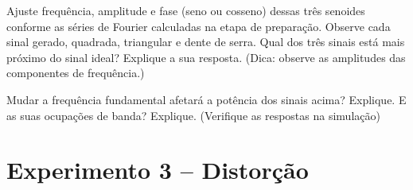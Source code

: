 \documentclass[12pt,addpoints]{exam}
\begin{document}
\begin{questions}
  \question Ajuste frequência, amplitude e fase (seno ou cosseno) dessas três senoides conforme as séries de Fourier calculadas na etapa de preparação. Observe cada sinal gerado, quadrada, triangular e dente de serra. Qual dos três sinais está mais próximo do sinal ideal? Explique a sua resposta. (Dica: observe as amplitudes das componentes de frequência.)
  \fillwithlines{0.5in}

    

    \question Mudar a frequência fundamental afetará a potência dos sinais acima? Explique. E as suas ocupações de banda? Explique. (Verifique as respostas na simulação)
    \fillwithlines{0.5in}

\end{questions}

\section*{Experimento 3 -- Distorção}
\end{document}
